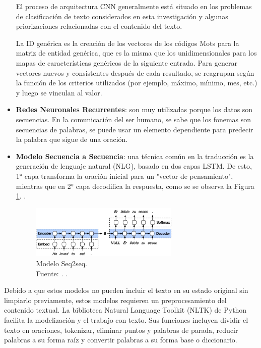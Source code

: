 \begin{itemize}
 	El proceso de arquitectura CNN generalmente está situado en los problemas de clasificación de texto considerados en esta investigación y algunas priorizaciones relacionadas con el contenido del texto.

 	La ID genérica es la creación de los vectores de los códigos Mots para la matriz de entidad genérica, que es la misma que los unidimensionales para los mapas de características genéricos de la siguiente entrada. Para generar vectores nuevos y consistentes después de cada resultado, se reagrupan según la función de los criterios utilizados (por ejemplo, máximo, mínimo, mes, etc.) y luego se vinculan al valor.

	\item \textbf{Redes Neuronales Recurrentes}: son muy utilizadas porque los datos son secuencias. En la comunicación del ser humano, se sabe que los fonemas son secuencias de palabras, se puede usar un elemento dependiente para predecir la palabra que sigue de una oración. \parencite{bk_rao2019nlp_pytorch}
	
	\item \textbf{Modelo Secuencia a Secuencia}: una técnica común en la traducción es la generación de lenguaje natural (NLG), basado en dos capas LSTM. De esto, 1° capa transforma la oración inicial para un "vector de pensamiento", mientras que en 2° capa decodifica la respuesta, como se se observa la Figura \ref{2:fig46}. \parencite{bk_deng2018deeplearningnlp}.
	
	\begin{figure}[!ht]
		\begin{center}
			\includegraphics[width=0.67\textwidth]{2/figures/encoder-decoder.jpg}
			\caption[Modelo Seq2seq]{Modelo Seq2seq.\\
			Fuente: \cite{tec_kostadinov2019seq2seq}. .}
			\label{2:fig46}
		\end{center}
	\end{figure}	
\end{itemize}

Debido a que estos modelos no pueden incluir el texto en su estado original sin limpiarlo previamente, estos modelos requieren un preprocesamiento del contenido textual. La biblioteca Natural Language Toolkit (NLTK) de Python facilita la modelización y el trabajo con texto. Sus funciones incluyen dividir el texto en oraciones, tokenizar, eliminar puntos y palabras de parada, reducir palabras a su forma raíz y convertir palabras a su forma base o diccionario. \parencite{bk_brownlee2017deeplearning_nlp}

